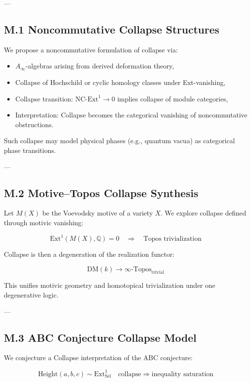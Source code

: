 \documentclass[11pt]{article}
\begin{document}
\begin{axiom}
\begin{axiom}
{{---

\subsection*{M.1 Noncommutative Collapse Structures}

We propose a noncommutative formulation of collapse via:

\begin{itemize}
  \item $A_\infty$-algebras arising from derived deformation theory,
  \item Collapse of Hochschild or cyclic homology classes under Ext-vanishing,
  \item Collapse transition: $\text{NC-Ext}^1 \to 0$ implies collapse of module categories,
  \item Interpretation: Collapse becomes the categorical vanishing of noncommutative obstructions.
\end{itemize}

Such collapse may model physical phases (e.g., quantum vacua) as categorical phase transitions.

---

\subsection*{M.2 Motive–Topos Collapse Synthesis}

Let $M(X)$ be the Voevodsky motive of a variety $X$.  
We explore collapse defined through motivic vanishing:

\[
\mathrm{Ext}^1(M(X), \mathbb{Q}) = 0 \quad \Rightarrow \quad \text{Topos trivialization}
\]

Collapse is then a degeneration of the realization functor:

\[
\mathrm{DM}(k) \to \infty\text{-Topos}_{\text{trivial}}
\]

This unifies motivic geometry and homotopical trivialization under one degenerative logic.

---

\subsection*{M.3 ABC Conjecture Collapse Model}

We conjecture a Collapse interpretation of the ABC conjecture:

\[
\text{Height}(a,b,c) \sim \mathrm{Ext}^1_{\mathrm{Sel}} \quad \text{collapse} \Rightarrow \text{inequality saturation}
\]

}}
\end{axiom}
\end{axiom}
\end{document}
